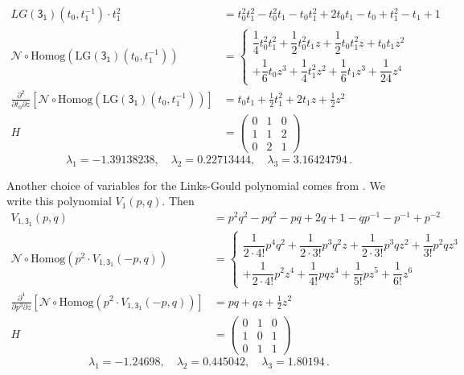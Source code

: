 \documentclass[12pt,reqno]{amsart}
\theoremstyle{definition}
\def\LG{\mathrm{LG}}
\def\homog{\mathrm{Homog}}
\def\normal{\mathcal{N}}
\begin{document}
\begin{align*}
LG(\mathsf{3_1})(t_0,t_1^{-1})  \cdot  t_1^2 &= t_0^2 t_1^2 - t_0^2 t_1 - t_0 t_1^2 + 2 t_0 t_1 - t_0 + t_1^2 - t_1 + 1\\
\normal\circ\homog(\LG(\mathsf{3_1})(t_0,t_1^{-1})) &= \left\lbrace
\begin{matrix}
    \dfrac{1}{4} t_0^2 t_1^2 + \dfrac{1}{2} t_0^2 t_1 z + \dfrac{1}{2} t_0 t_1^2 z + t_0 t_1 z^2
    \\[2ex]
    + \dfrac{1}{6} t_0 z^3 + \dfrac{1}{4} t_1^2 z^2 + \dfrac{1}{6} t_1 z^3 + \dfrac{1}{24} z^4
\end{matrix}\right. \\
\frac{\partial^2}{\partial t_0 \partial z}[\normal\circ\homog(\LG(\mathsf{3_1})(t_0,t_1^{-1}))]&= t_0 t_1 + \frac{1}{2} t_1^2 + 2 t_1 z + \frac{1}{2} z^2
\\
H &= \begin{pmatrix} 0&1&0\\1&1&2\\0&2&1
\end{pmatrix}
\end{align*}
\[\lambda_1 = -1.39138238, \quad \lambda_2= 0.22713444,\quad  
\lambda_3 = 3.16424794\,.\]

Another choice of variables for the Links-Gould polynomial comes from \cite{GK:multi}. We write this polynomial $V_1(p,q)$. Then 
\begin{align*}
    V_{1,\mathsf{3_1}}(p,q)&=p^2q^2 - pq^2 - pq + 2q + 1 - qp^{-1} - p^{-1} + p^{-2}
    \\
    \normal\circ\homog(p^2\cdot V_{1,\mathsf{3_1}}(-p,q))&=\left\lbrace
    \begin{matrix}
        \dfrac{1}{2\cdot 4!}p^4q^2 + \dfrac{1}{2\cdot 3!}p^3q^2z + \dfrac{1}{2\cdot 3!}p^3qz^2+ \dfrac{1}{3!}p^2qz^3
        \\[2ex]
         + \dfrac{1}{2\cdot 4!}p^2z^4 + \dfrac{1}{4!}pqz^4 + \dfrac{1}{5!}pz^5 + \dfrac{1}{6!}z^6
    \end{matrix}  
    \right.
    \\
    \frac{\partial^4}{\partial p^3 \partial z}
    [\normal\circ\homog(p^2\cdot V_{1,\mathsf{3_1}}(-p,q))]
    &=
    pq + qz + \frac{1}{2}z^2
    \\
    H&=\begin{pmatrix} 0&1&0\\1&0&1\\0&1&1
\end{pmatrix}
\end{align*}
\[\lambda_1=-1.24698, 
    \quad 
    \lambda_2=0.445042,
    \quad
    \lambda_3=1.80194\,.\]
\end{document}
